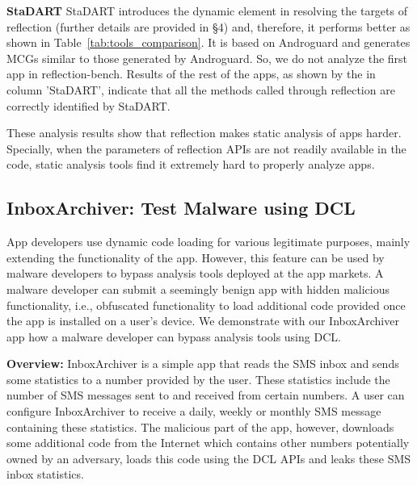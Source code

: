 \begin{description}[style=unboxed,leftmargin=0cm]
\item \textbf{StaDART} StaDART introduces the dynamic element in resolving the targets of reflection (further details are provided in \S4) and, therefore, it performs better as shown in Table~\ref{tab:tools_comparison}. It is based on Androguard and generates MCGs similar to those generated by Androguard. So, we do not analyze the first app in reflection-bench. Results of the rest of the apps, as shown by the  in column 'StaDART', indicate that all the methods called through reflection are correctly identified by StaDART.



\end{description}


These analysis results show that reflection makes static analysis of apps harder. Specially, when the parameters of reflection APIs are not readily available in the code, static analysis tools find it extremely hard to properly analyze apps.  

\subsection{InboxArchiver: Test Malware using DCL}

App developers use dynamic code loading for various legitimate purposes, mainly extending the functionality of the app. However, this feature can be used by malware developers to bypass analysis tools deployed at the app markets. A malware developer can submit a seemingly benign app with hidden malicious functionality, i.e., obfuscated functionality to load additional code provided once the app is installed on a user's device. We demonstrate with our InboxArchiver app how a malware developer can bypass analysis tools using DCL.

\textbf{Overview:} InboxArchiver is a simple app that reads the SMS inbox and sends some statistics to a number provided by the user. These statistics include the number of SMS messages sent to and received from certain numbers. A user can configure InboxArchiver to receive a daily, weekly or monthly SMS message containing these statistics. The malicious part of the app, however, downloads some additional code from the Internet which contains other numbers potentially owned by an adversary, loads this code using the DCL APIs and leaks these SMS inbox statistics.


